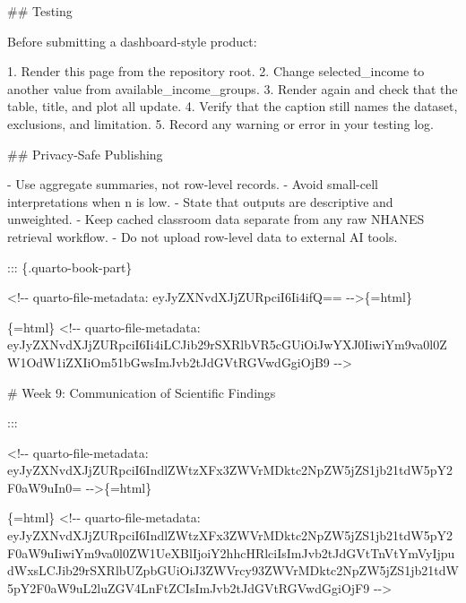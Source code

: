 \documentclass[
  letterpaper,
  DIV=11,
  numbers=noendperiod,
  oneside]{scrreprt}
\newenvironment{Shaded}{\begin{snugshade}}{\end{snugshade}}
\newcommand{\FunctionTok}[1]{\textcolor[rgb]{0.28,0.35,0.67}{#1}}
\newcommand{\InformationTok}[1]{\textcolor[rgb]{0.37,0.37,0.37}{#1}}
\newcommand{\NormalTok}[1]{\textcolor[rgb]{0.00,0.23,0.31}{#1}}
\newcommand{\SpecialStringTok}[1]{\textcolor[rgb]{0.13,0.47,0.30}{#1}}
\begin{document}
\begin{Shaded}
\begin{Highlighting}[numbers=left,,]
\FunctionTok{\#\# Testing}

\NormalTok{Before submitting a dashboard{-}style product:}

\SpecialStringTok{1. }\NormalTok{Render this page from the repository root.}
\SpecialStringTok{2. }\NormalTok{Change }\InformationTok{\textasciigrave{}selected\_income\textasciigrave{}}\NormalTok{ to another value from }\InformationTok{\textasciigrave{}available\_income\_groups\textasciigrave{}}\NormalTok{.}
\SpecialStringTok{3. }\NormalTok{Render again and check that the table, title, and plot all update.}
\SpecialStringTok{4. }\NormalTok{Verify that the caption still names the dataset, exclusions, and limitation.}
\SpecialStringTok{5. }\NormalTok{Record any warning or error in your testing log.}

\FunctionTok{\#\# Privacy{-}Safe Publishing}

\SpecialStringTok{{-} }\NormalTok{Use aggregate summaries, not row{-}level records.}
\SpecialStringTok{{-} }\NormalTok{Avoid small{-}cell interpretations when }\InformationTok{\textasciigrave{}n\textasciigrave{}}\NormalTok{ is low.}
\SpecialStringTok{{-} }\NormalTok{State that outputs are descriptive and unweighted.}
\SpecialStringTok{{-} }\NormalTok{Keep cached classroom data separate from any raw NHANES retrieval workflow.}
\SpecialStringTok{{-} }\NormalTok{Do not upload row{-}level data to external AI tools.}


\NormalTok{::: \{.quarto{-}book{-}part\}}


\InformationTok{\textasciigrave{}\textless{}!{-}{-} quarto{-}file{-}metadata: eyJyZXNvdXJjZURpciI6Ii4ifQ== {-}{-}\textgreater{}\textasciigrave{}}\NormalTok{\{=html\}}

\InformationTok{\textasciigrave{}\textasciigrave{}\textasciigrave{}\{=html\}}
\InformationTok{\textless{}!{-}{-} quarto{-}file{-}metadata: eyJyZXNvdXJjZURpciI6Ii4iLCJib29rSXRlbVR5cGUiOiJwYXJ0IiwiYm9va0l0ZW1OdW1iZXIiOm51bGwsImJvb2tJdGVtRGVwdGgiOjB9 {-}{-}\textgreater{}}
\InformationTok{\textasciigrave{}\textasciigrave{}\textasciigrave{}}

\FunctionTok{\# Week 9: Communication of Scientific Findings}


\NormalTok{:::}



\InformationTok{\textasciigrave{}\textless{}!{-}{-} quarto{-}file{-}metadata: eyJyZXNvdXJjZURpciI6IndlZWtzXFx3ZWVrMDktc2NpZW5jZS1jb21tdW5pY2F0aW9uIn0= {-}{-}\textgreater{}\textasciigrave{}}\NormalTok{\{=html\}}

\InformationTok{\textasciigrave{}\textasciigrave{}\textasciigrave{}\{=html\}}
\InformationTok{\textless{}!{-}{-} quarto{-}file{-}metadata: eyJyZXNvdXJjZURpciI6IndlZWtzXFx3ZWVrMDktc2NpZW5jZS1jb21tdW5pY2F0aW9uIiwiYm9va0l0ZW1UeXBlIjoiY2hhcHRlciIsImJvb2tJdGVtTnVtYmVyIjpudWxsLCJib29rSXRlbUZpbGUiOiJ3ZWVrcy93ZWVrMDktc2NpZW5jZS1jb21tdW5pY2F0aW9uL2luZGV4LnFtZCIsImJvb2tJdGVtRGVwdGgiOjF9 {-}{-}\textgreater{}}
\InformationTok{\textasciigrave{}\textasciigrave{}\textasciigrave{}}


\end{Highlighting}
\end{Shaded}
\end{document}
